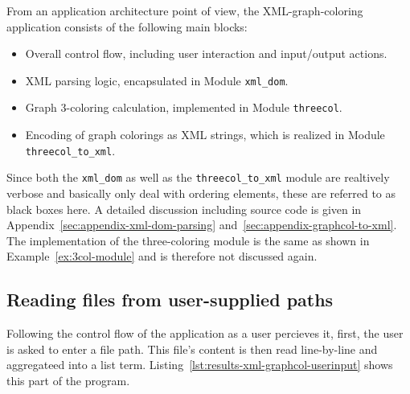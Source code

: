 From an application architecture point of view, the XML-graph-coloring application consists of the following main blocks:
\begin{itemize}
    \item Overall control flow, including user interaction and input/output actions.
    \item XML parsing logic, encapsulated in Module \texttt{xml\_dom}.
    \item Graph 3-coloring calculation, implemented in Module \texttt{threecol}.
    \item Encoding of graph colorings as XML strings, which is realized in Module \texttt{threecol\_to\_xml}.
\end{itemize}    
Since both the \texttt{xml\_dom} as well as the \texttt{threecol\_to\_xml} module are realtively verbose and basically only deal with ordering elements, these are referred to as black boxes here. A detailed discussion including source code is given in Appendix~\ref{sec:appendix-xml-dom-parsing} and~\ref{sec:appendix-graphcol-to-xml}. The implementation of the three-coloring module is the same as shown in Example~\ref{ex:3col-module} and is therefore not discussed again.

\subsection{Reading files from user-supplied paths}

Following the control flow of the application as a user percieves it, first, the user is asked to enter a file path. This file's content is then read line-by-line and aggregateed into a list term. Listing~\ref{lst:results-xml-graphcol-userinput} shows this part of the program.

